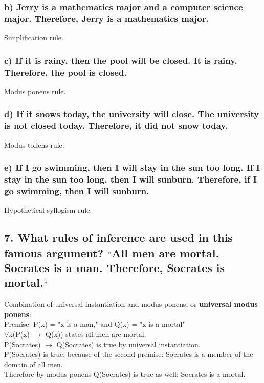 \documentclass[11pt, oneside]{article} %
\numberwithin{equation}{section} %
\numberwithin{figure}{section} %
\numberwithin{table}{section} %
\begin{document}
\subsubsection{b) Jerry is a mathematics major and a computer science
major. Therefore, Jerry is a mathematics major.}
Simplification rule.
\subsubsection{c) If it is rainy, then the pool will be closed. It is rainy.
Therefore, the pool is closed.}
Modus ponens rule.
\subsubsection{d) If it snows today, the university will close. The university is not closed today. Therefore, it did not snow today.}
Modus tollens rule.
\subsubsection{e) If I go swimming, then I will stay in the sun too long.
If I stay in the sun too long, then I will sunburn. Therefore, if I go swimming, then I will sunburn.}
Hypothetical syllogism rule.

\subsection{7. What rules of inference are used in this famous argument? $"$All men are mortal. Socrates is a man. Therefore, Socrates is mortal.$"$}
Combination of universal instantiation and modus ponens, or \textbf{universal modus ponens}: \\
Premise: P(x) = "x is a man," and Q(x) = "x is a mortal" \\
$\forall$x(P(x) $\rightarrow$ Q(x)) states all men are mortal. \\
P(Socrates) $\rightarrow$ Q(Socrates) is true by universal instantiation. \\
P(Socrates) is true, because of the second premise: Socrates is a member of the domain of all men. \\
Therefore by modus ponens Q(Socrates) is true as well: Socrates is a mortal. 
\end{document}
